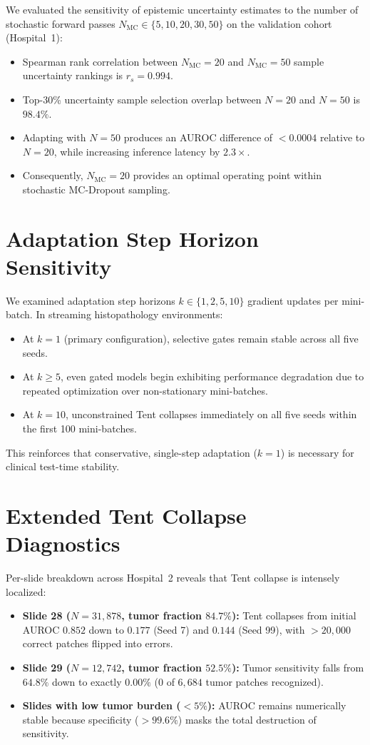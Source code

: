 \documentclass[journal]{IEEEtran}
\begin{document}
We evaluated the sensitivity of epistemic uncertainty estimates to the number of stochastic forward passes $N_{\mathrm{MC}} \in \{5, 10, 20, 30, 50\}$ on the validation cohort (Hospital~1):
\begin{itemize}
\item Spearman rank correlation between $N_{\mathrm{MC}}=20$ and $N_{\mathrm{MC}}=50$ sample uncertainty rankings is $r_s = 0.994$.
\item Top-30\% uncertainty sample selection overlap between $N=20$ and $N=50$ is $98.4\%$.
\item Adapting with $N=50$ produces an AUROC difference of $<0.0004$ relative to $N=20$, while increasing inference latency by $2.3\times$.
\item Consequently, $N_{\mathrm{MC}}=20$ provides an optimal operating point within stochastic MC-Dropout sampling.
\end{itemize}

\section{Adaptation Step Horizon Sensitivity}
\label{sec:supp_ksteps}

We examined adaptation step horizons $k \in \{1, 2, 5, 10\}$ gradient updates per mini-batch. In streaming histopathology environments:
\begin{itemize}
\item At $k=1$ (primary configuration), selective gates remain stable across all five seeds.
\item At $k \ge 5$, even gated models begin exhibiting performance degradation due to repeated optimization over non-stationary mini-batches.
\item At $k=10$, unconstrained Tent collapses immediately on all five seeds within the first 100 mini-batches.
\end{itemize}
This reinforces that conservative, single-step adaptation ($k=1$) is necessary for clinical test-time stability.

\section{Extended Tent Collapse Diagnostics}
\label{sec:supp_tent_diagnostics}

Per-slide breakdown across Hospital~2 reveals that Tent collapse is intensely localized:
\begin{itemize}
\item \textbf{Slide 28 ($N=31{,}878$, tumor fraction $84.7\%$):} Tent collapses from initial AUROC $0.852$ down to $0.177$ (Seed 7) and $0.144$ (Seed 99), with $>20{,}000$ correct patches flipped into errors.
\item \textbf{Slide 29 ($N=12{,}742$, tumor fraction $52.5\%$):} Tumor sensitivity falls from $64.8\%$ down to exactly $0.00\%$ ($0$ of $6{,}684$ tumor patches recognized).
\item \textbf{Slides with low tumor burden ($<5\%$):} AUROC remains numerically stable because specificity ($>99.6\%$) masks the total destruction of sensitivity.
\end{itemize}
\end{document}
